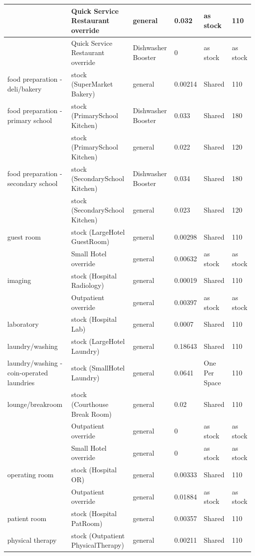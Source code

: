 \begin{center}
\begin{longtable}{|p{1.7in}|p{1.6in}|p{0.9in}|p{0.7in}|p{0.75in}|p{0.55in}|}
 & Quick Service Restaurant override & general & 0.032 & as stock & 110 \\ \hline
 & Quick Service Restaurant override & Dishwasher Booster & 0 & as stock & as stock \\ \hline
food preparation - deli/bakery & stock (SuperMarket Bakery) & general & 0.00214 & Shared & 110 \\ \hline
food preparation - primary school & stock (PrimarySchool Kitchen) & Dishwasher Booster & 0.033 & Shared & 180 \\ \hline
 & stock (PrimarySchool Kitchen) & general & 0.022 & Shared & 120 \\ \hline
food preparation - secondary school & stock (SecondarySchool Kitchen) & Dishwasher Booster & 0.034 & Shared & 180 \\ \hline
 & stock (SecondarySchool Kitchen) & general & 0.023 & Shared & 120 \\ \hline
guest room & stock (LargeHotel GuestRoom) & general & 0.00298 & Shared & 110 \\ \hline
 & Small Hotel override & general & 0.00632 & as stock & as stock \\ \hline
imaging & stock (Hospital Radiology) & general & 0.00019 & Shared & 110 \\ \hline
 & Outpatient override & general & 0.00397 & as stock & as stock \\ \hline
laboratory & stock (Hospital Lab) & general & 0.0007 & Shared & 110 \\ \hline
laundry/washing & stock (LargeHotel Laundry) & general & 0.18643 & Shared & 110 \\ \hline
laundry/washing - coin-operated laundries & stock (SmallHotel Laundry) & general & 0.0641 & One Per Space & 110 \\ \hline
lounge/breakroom & stock (Courthouse Break Room) & general & 0.02 & Shared & 110 \\ \hline
 & Outpatient override & general & 0 & as stock & as stock \\ \hline
 & Small Hotel override & general & 0 & as stock & as stock \\ \hline
operating room & stock (Hospital OR) & general & 0.00333 & Shared & 110 \\ \hline
 & Outpatient override & general & 0.01884 & as stock & as stock \\ \hline
patient room & stock (Hospital PatRoom) & general & 0.00357 & Shared & 110 \\ \hline
physical therapy & stock (Outpatient PhysicalTherapy) & general & 0.00211 & Shared & 110 \\ \hline

\end{longtable}
\end{center}

